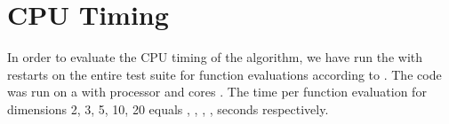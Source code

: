 \documentclass[sigconf]{acmart}
\begin{document}




\maketitle


%
%
%

\section{CPU Timing}
In order to evaluate the CPU timing of the algorithm, we have run the \change{\algorithmA} with restarts on the entire \bbobmixint test suite \cite{tusar2019mixint} for  function evaluations according to \cite{hansen2016exp}.
 The  code was run on a  with  processor and  cores . The time per function evaluation for dimensions 2, 3, 5, 10, 20 equals , , , ,  seconds respectively. 

\end{document}
